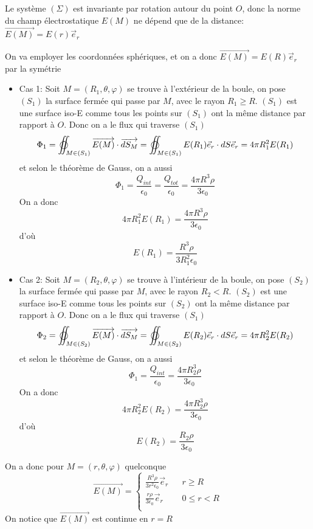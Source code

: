 \documentclass[a4paper,12pt]{book}
\begin{document}
Le système $(\Sigma)$ est invariante par rotation autour du point $O$, donc la norme du champ électrostatique $E(M)$ ne dépend que de la distance: $\overrightarrow{E(M)}=E(r)\vec{e}_r$ 

On va employer les coordonnées sphériques, et on a donc $\overrightarrow{E(M)}=E(R)\vec{e}_r$ par la symétrie
\begin{itemize}
    \item Cas 1: Soit $M=(R_1,\theta,\varphi)$ se trouve à l'extérieur de la boule, on pose $(S_1)$ la surface fermée qui passe par $M$, avec le rayon $R_1\geq R$. 
    $(S_1)$ est une surface iso-E comme tous les points sur $(S_1)$ ont la même distance par rapport à $O$. 
    Donc on a le flux qui traverse $(S_1)$
    $$
    \Phi_1=\varoiint_{M \in (S_1)} \overrightarrow{E(M)}\cdot \overrightarrow{dS_M}=\varoiint_{M \in (S_1)} E(R_1)\vec{e}_r\cdot dS\vec{e}_r=4\pi R_1^2E(R_1)
    $$
    et selon le théorème de Gauss, on a aussi
    $$
    \Phi_1=\frac{Q_{int}}{\epsilon_0}=\frac{Q_{tot}}{\epsilon_0}=\frac{4\pi R^3\rho}{3\epsilon_0}
    $$
    On a donc 
    $$
    4\pi R_1^2E(R_1)=\frac{4\pi R^3\rho}{3\epsilon_0}
    $$
    d'où
    $$
    \boxed{E(R_1)=\frac{R^3\rho}{3R_1^2\epsilon_0}}
    $$
    \item Cas 2: Soit $M=(R_2,\theta,\varphi)$ se trouve à l'intérieur de la boule, on pose $(S_2)$ la surface fermée qui passe par $M$, avec le rayon $R_2 < R$. 
    $(S_2)$ est une surface iso-E comme tous les points sur $(S_2)$ ont la même distance par rapport à $O$. 
    Donc on a le flux qui traverse $(S_1)$
    $$
    \Phi_2=\varoiint_{M \in (S_2)} \overrightarrow{E(M)}\cdot \overrightarrow{dS_M}=\varoiint_{M \in (S_2)} E(R_2)\vec{e}_r\cdot dS\vec{e}_r=4\pi R_2^2E(R_2)
    $$
    et selon le théorème de Gauss, on a aussi
    $$
    \Phi_1=\frac{Q_{int}}{\epsilon_0}=\frac{4\pi R_2^3\rho}{3\epsilon_0}
    $$
    On a donc 
    $$
    4\pi R_2^2E(R_2)=\frac{4\pi R_2^3\rho}{3\epsilon_0}
    $$
    d'où
    $$
    \boxed{E(R_2)=\frac{R_2\rho}{3\epsilon_0}}
    $$
\end{itemize}
On a donc pour $M=(r,\theta,\varphi)$ quelconque
\begin{equation}  \nonumber
    \boxed{\overrightarrow{E(M)}=\left\{  
                 \begin{array}{rcl}  
                    \frac{R^3\rho}{3r^2\epsilon_0}\vec{e}_r & & r \geq R\\
                    \frac{r\rho}{3\epsilon_0}\vec{e}_r & & 0\leq r<R\\
                 \end{array}  
    \right.  }
\end{equation}
On notice que $\overrightarrow{E(M)}$ est continue en $r=R$
\end{document}
